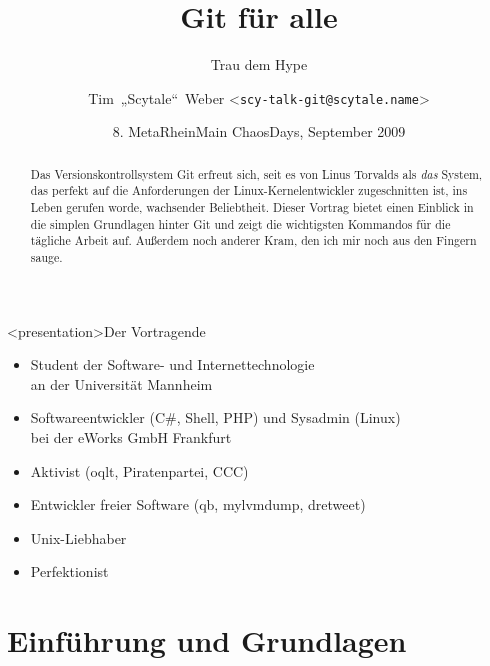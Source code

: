 

\title{Git für alle}
\subtitle{Trau dem Hype}
\author[Tim~„Scytale“~Weber]{Tim~„Scytale“~Weber <\texttt{scy-talk-git@scytale.name}>}
\date[MRMCD 0x08h]{8. MetaRheinMain ChaosDays, September 2009}
\UseOverviews
\def\HW{{\color{red}$^\star$}}



\begin{frame}\maketitle\end{frame}

\begin{abstract}
Das Versionskontrollsystem Git erfreut sich, seit es von Linus Torvalds als \emph{das} System, das perfekt auf die Anforderungen der Linux-Kernel\-entwickler zugeschnitten ist, ins Leben gerufen worde, wachsender Beliebtheit.
Dieser Vortrag bietet einen Einblick in die simplen Grundlagen hinter Git und zeigt die wichtigsten Kommandos für die tägliche Arbeit auf.
Außerdem noch anderer Kram, den ich mir noch aus den Fingern sauge.%
\end{abstract}

\begin{frame}<presentation>{Der Vortragende}
\begin{itemize}
	\item Student der Software- und Internettechnologie\\an der Universität Mannheim
	\item Softwareentwickler (C\#, Shell, PHP) und Sysadmin (Linux)\\bei der eWorks GmbH Frankfurt
	\item Aktivist (oqlt, Piratenpartei, CCC)
	\item Entwickler freier Software (qb, mylvmdump, dretweet)
	\item Unix-Liebhaber
	\item Perfektionist
\end{itemize}
\end{frame}

\tableofcontents



\section{Einführung und Grundlagen}

